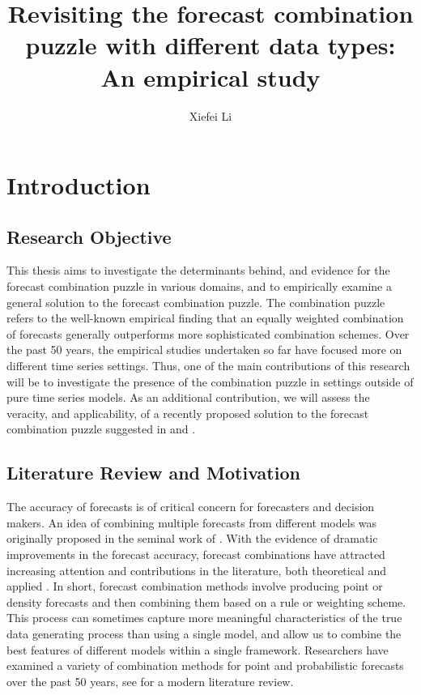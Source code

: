 \documentclass{monashthesis}
\author{Xiefei Li}
\title{Revisiting the forecast combination puzzle with different data types: An empirical study}
\begin{document}

\titlepage

{\sf\tighttoc\doublespacing}

\clearpage{}\setcounter{page}{1}

\hypertarget{introduction}{%
\chapter{Introduction}\label{introduction}}

\hypertarget{research-objective}{%
\section{Research Objective}\label{research-objective}}

This thesis aims to investigate the determinants behind, and evidence for the forecast combination puzzle in various domains, and to empirically examine a general solution to the forecast combination puzzle. The combination puzzle refers to the well-known empirical finding that an equally weighted combination of forecasts generally outperforms more sophisticated combination schemes. Over the past 50 years, the empirical studies undertaken so far have focused more on different time series settings. Thus, one of the main contributions of this research will be to investigate the presence of the combination puzzle in settings outside of pure time series models. As an additional contribution, we will assess the veracity, and applicability, of a recently proposed solution to the forecast combination puzzle suggested in \textcite{ZMFP22} and \textcite{FZMP23}.

\hypertarget{literature-review-and-motivation}{%
\section{Literature Review and Motivation}\label{literature-review-and-motivation}}

The accuracy of forecasts is of critical concern for forecasters and decision makers. An idea of combining multiple forecasts from different models was originally proposed in the seminal work of \textcite{BG69}. With the evidence of dramatic improvements in the forecast accuracy, forecast combinations have attracted increasing attention and contributions in the literature, both theoretical and applied \autocite{C89,T06}. In short, forecast combination methods involve producing point or density forecasts and then combining them based on a rule or weighting scheme. This process can sometimes capture more meaningful characteristics of the true data generating process than using a single model, and allow us to combine the best features of different models within a single framework. Researchers have examined a variety of combination methods for point and probabilistic forecasts over the past 50 years, see \textcite{WHLK22} for a modern literature review.
\end{document}
